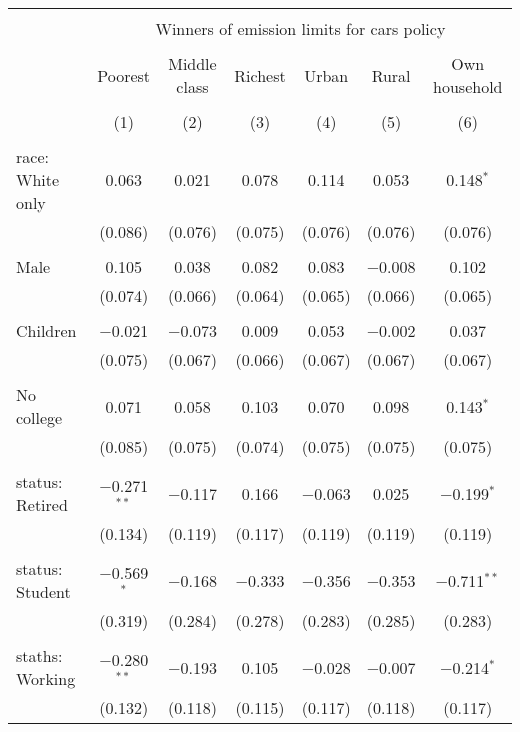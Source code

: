 
\begin{tabular}{@{\extracolsep{5pt}}lcccccc} 
\\[-1.8ex]\hline 
\hline \\[-1.8ex] 
 & \multicolumn{6}{c}{Winners of emission limits for cars policy} \\ 
\cline{2-7} 
\\[-1.8ex] & Poorest & Middle class & Richest & Urban & Rural & Own household \\ 
\\[-1.8ex] & (1) & (2) & (3) & (4) & (5) & (6)\\ 
\hline \\[-1.8ex] 
 race: White only & 0.063 & 0.021 & 0.078 & 0.114 & 0.053 & 0.148$^{*}$ \\ 
  & (0.086) & (0.076) & (0.075) & (0.076) & (0.076) & (0.076) \\ 
  & & & & & & \\ 
 Male & 0.105 & 0.038 & 0.082 & 0.083 & $-$0.008 & 0.102 \\ 
  & (0.074) & (0.066) & (0.064) & (0.065) & (0.066) & (0.065) \\ 
  & & & & & & \\ 
 Children & $-$0.021 & $-$0.073 & 0.009 & 0.053 & $-$0.002 & 0.037 \\ 
  & (0.075) & (0.067) & (0.066) & (0.067) & (0.067) & (0.067) \\ 
  & & & & & & \\ 
 No college & 0.071 & 0.058 & 0.103 & 0.070 & 0.098 & 0.143$^{*}$ \\ 
  & (0.085) & (0.075) & (0.074) & (0.075) & (0.075) & (0.075) \\ 
  & & & & & & \\ 
 status: Retired & $-$0.271$^{**}$ & $-$0.117 & 0.166 & $-$0.063 & 0.025 & $-$0.199$^{*}$ \\ 
  & (0.134) & (0.119) & (0.117) & (0.119) & (0.119) & (0.119) \\ 
  & & & & & & \\ 
 status: Student & $-$0.569$^{*}$ & $-$0.168 & $-$0.333 & $-$0.356 & $-$0.353 & $-$0.711$^{**}$ \\ 
  & (0.319) & (0.284) & (0.278) & (0.283) & (0.285) & (0.283) \\ 
  & & & & & & \\ 
 staths: Working & $-$0.280$^{**}$ & $-$0.193 & 0.105 & $-$0.028 & $-$0.007 & $-$0.214$^{*}$ \\ 
  & (0.132) & (0.118) & (0.115) & (0.117) & (0.118) & (0.117) \\ 

\end{tabular}
